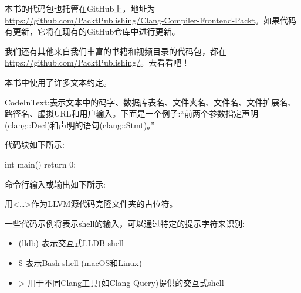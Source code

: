 
本书的代码包也托管在GitHub上，地址为 \url{https://github.com/PacktPublishing/Clang-Compiler-Frontend-Packt}。如果代码有更新，它将在现有的GitHub仓库中进行更新。

我们还有其他来自我们丰富的书籍和视频目录的代码包，都在 \url{https://github.com/PacktPublishing/}。去看看吧！



本书中使用了许多文本约定。

​CodeInText:表示文本中的码字、数据库表名、文件夹名、文件名、文件扩展名、路径名、虚拟URL和用户输入。下面是一个例子:“前两个参数指定声明(clang::Decl)和声明的语句(clang::Stmt)。”

代码块如下所示:

\begin{cpp}
int main() {
  return 0;
}
\end{cpp}

命令行输入或输出如下所示:


用<…>作为LLVM源代码克隆文件夹的占位符。

​一些代码示例将表示shell的输入，可以通过特定的提示字符来识别:

\begin{itemize}
\item
(lldb) 表示交互式LLDB shell

\item
\$ 表示Bash shell (macOS和Linux)

\item
> 用于不同Clang工具(如Clang-Query)提供的交互式shell
\end{itemize}




